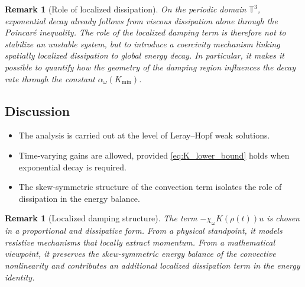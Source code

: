 \documentclass[preprint,12pt]{elsarticle}
\newtheorem{remark}[theorem]{Remark}
\begin{document}
\begin{remark}[Role of localized dissipation]
On the periodic domain $\mathbb{T}^3$, exponential decay already follows from
viscous dissipation alone through the Poincar\'e inequality.
The role of the localized damping term is therefore not to stabilize an unstable
system, but to introduce a coercivity mechanism linking spatially localized
dissipation to global energy decay.
In particular, it makes it possible to quantify how the geometry of the damping
region influences the decay rate through the constant
$\alpha_\omega(K_{\min})$.
\end{remark}

\subsection{Discussion}

\begin{itemize}
\item The analysis is carried out at the level of Leray--Hopf weak solutions.
\item Time-varying gains are allowed, provided \eqref{eq:K_lower_bound} holds
when exponential decay is required.
\item The skew-symmetric structure of the convection term isolates the role of
dissipation in the energy balance.
\end{itemize}

\begin{remark}[Localized damping structure]
\label{rem:physical_damping}
The term $-\chi_\omega K(\rho(t))u$ is chosen in a proportional and dissipative
form.
From a physical standpoint, it models resistive mechanisms that locally extract
momentum.
From a mathematical viewpoint, it preserves the skew-symmetric energy balance of
the convective nonlinearity and contributes an additional localized dissipation
term in the energy identity.
\end{remark}
\end{document}
